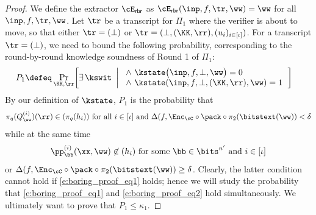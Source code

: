 \begin{proof}
 We define the extractor  $\cE_{\mathsf{rbr}}$ as $\cE_{\mathsf{rbr}}(\inp,f,\tr,\ww)=\ww$ for all $\inp,f,\tr,\ww$. Let $\tr$ be a transcript for $\Pi_1$ where the verifier is about to move, so that either $\tr=(\bot)$ or $\tr=(\bot, (\KK,\rr), (u_i)_{i\in[\iota]})$. For a transcript $\tr=(\bot)$, we need to bound the following probability, corresponding to the round-by-round knowledge soundness of Round 1 of $\Pi_1$:
%
\begin{align*}
  P_1\defeq &\Pr_{\KK,\rr}\!\left[
  \exists\,\kswit \ \left| \ \begin{array}{l}
  \wedge\ \kstate\bigl(\inp,f,\bot,\ww\bigr)=0\\
  \wedge\ \kstate(\inp,f, \bot,(\KK,\rr),\ww)=1
  \end{array}
  \right.\right] 
\end{align*}
% 
By our definition of $\kstate$, $P_1$ is the probability that 
%
\begin{equation}\label{e:boring_proof_eq1}\pi_q(Q_{\ww}^{(i)})(\rr) \in (\pi_q(h_i)) \text{ for all } i\in [\iota] \text{ and } \Delta(f, \Enc_{\cC}\circ \pack \circ \pi_2(\bitstext(\ww))<\delta
\end{equation} while at the same time \begin{equation}\label{e:boring_proof_eq2}\pp_\bb^{(i)}(\xx,\ww)\not\in (h_i) \text{ for some } \bb\in \bits^{n'} \text{ and } i\in [\iota]\end{equation} or $\Delta(f, \Enc_{\cC}\circ \pack \circ \pi_2(\bitstext(\ww))\geq\delta$. Clearly, the latter condition cannot hold if \eqref{e:boring_proof_eq1} holds; hence we will study the probability  that \eqref{e:boring_proof_eq1} and \eqref{e:boring_proof_eq2} hold simultaneously.  We ultimately want to prove that $P_1 \leq \kappa_1$.


\end{proof}
